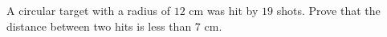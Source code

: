 A circular target with a radius of $12$ cm was hit by $19$ shots. Prove that the distance between two hits is less than $7$ cm.
